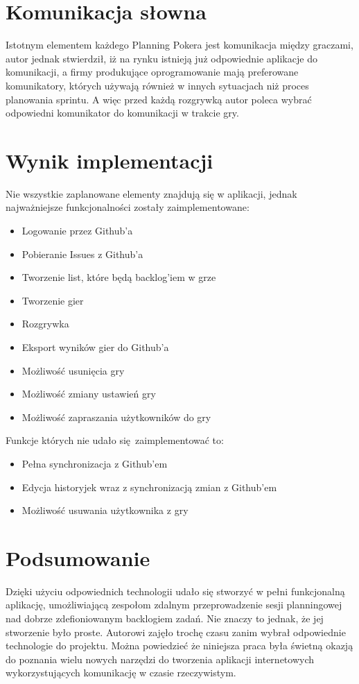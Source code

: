\section{Komunikacja słowna}

Istotnym elementem każdego Planning Pokera jest komunikacja między graczami,
autor jednak stwierdził,
iż na rynku istnieją już odpowiednie aplikacje do komunikacji,
a firmy produkujące oprogramowanie mają preferowane komunikatory, których używają
również w innych sytuacjach niż proces planowania sprintu.
A więc przed każdą rozgrywką autor poleca wybrać odpowiedni komunikator do komunikacji w trakcie gry.


\section{Wynik implementacji}

Nie wszystkie zaplanowane elementy znajdują się w aplikacji,
jednak najważniejsze funkcjonalności zostały zaimplementowane:

 \begin{itemize}
	\item Logowanie przez Github'a
	\item Pobieranie Issues z Github'a
	\item Tworzenie list, które będą backlog'iem w grze
	\item Tworzenie gier
	\item Rozgrywka
	\item Eksport wyników gier do Github'a
	\item Możliwość usunięcia gry
	\item Możliwość zmiany ustawień gry
	\item Możliwość zapraszania użytkowników do gry
\end{itemize}

Funkcje których nie udało się zaimplementować to:

\begin{itemize}
	\item Pełna synchronizacja z Github'em
	\item Edycja historyjek wraz z synchronizacją zmian z Github'em
	\item Możliwość usuwania użytkownika z gry
\end{itemize}

\section{Podsumowanie}

Dzięki użyciu odpowiednich technologii udało się stworzyć w pełni funkcjonalną aplikację,
umożliwiającą zespołom zdalnym przeprowadzenie sesji planningowej nad dobrze
zdefioniowanym backlogiem zadań.
Nie znaczy to jednak, że jej stworzenie było proste.
Autorowi zajęło trochę czasu zanim wybrał odpowiednie technologie do projektu.
Można powiedzieć że niniejsza praca była świetną okazją do poznania
wielu nowych narzędzi do tworzenia aplikacji internetowych wykorzystujących
komunikację w czasie rzeczywistym.
